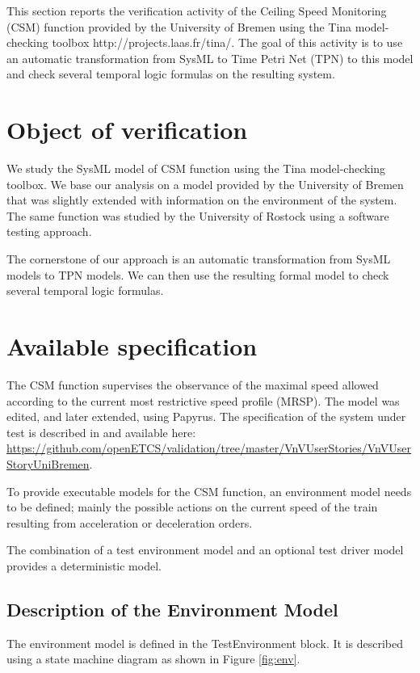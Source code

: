 \newcommand{\uml}{UML\xspace}
\newcommand{\marte}{MARTE\xspace}
\newcommand{\tpn}{TPN\xspace}
\newcommand{\sysml}{SysML\xspace}

\label{sec:laas}
This section reports the verification activity of the Ceiling Speed Monitoring (CSM) function provided by the University of Bremen using the Tina model-checking toolbox {http://projects.laas.fr/tina/}. The goal of this activity is to use an automatic transformation from SysML to Time Petri Net (TPN) to this model and check several temporal logic formulas on the resulting system.  

\section{Object of verification}

We study the SysML model of CSM function using the Tina model-checking toolbox. 
We base our analysis on a model provided by the University of Bremen that was slightly
extended with information on the environment of the system. The same
function was studied by the University of Rostock using a software
testing approach.

The cornerstone of our approach is an automatic transformation from
SysML models to TPN models. We can then use the resulting formal
model to check several temporal logic formulas.

\section{Available specification}

The CSM function supervises the observance of the maximal speed allowed according to the current most restrictive speed profile (MRSP). The model was edited, and later extended, using Papyrus. 
The specification of the system under test is described in \cite{csmwp4} and available here: \url{https://github.com/openETCS/validation/tree/master/VnVUserStories/VnVUserStoryUniBremen}.  

To provide executable models for the CSM function, an environment model needs to be defined; mainly the possible actions on the current speed of the train resulting from 
acceleration or deceleration orders. 

The combination of a test environment model and an optional test driver
model provides a deterministic model. 

\subsection{Description of the Environment Model}
The environment model is defined in the TestEnvironment block. It is
described using a state machine diagram as shown in
Figure \ref{fig:env}.

